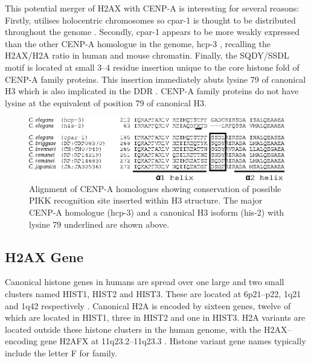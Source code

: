This potential merger of H2AX with \mbox{CENP-A} is interesting for
several reasons: Firstly,  utilises holocentric
chromosomes so \mbox{cpar-1} is thought to be distributed throughout
the genome \citep{MMH+05}. Secondly, \mbox{cpar-1} appears to be more
weakly expressed than the other \mbox{CENP-A} homologue in the
 genome, \mbox{hcp-3} \citep{MMH+05}, recalling
the H2AX/H2A ratio in human and mouse chromatin. Finally, the
SQDY/SSDL motif is located at small 3--4 residue insertion unique to
the core histone fold of \mbox{CENP-A} family proteins.
This insertion immediately abuts lysine 79 of canonical H3 which is
also implicated in the DDR
\@. \mbox{CENP-A} family
proteins do not have lysine at the equivalent of position 79 of
canonical H3.

\begin{figure}
\centering
\includegraphics{h2ax-review/figs/Fig1}
\caption[Alignment of  \mbox{CENP-A} homologues]%
        {Alignment of  \mbox{CENP-A}
          homologues showing conservation of possible PIKK recognition
          site inserted within H3 structure. The major
           \mbox{CENP-A} homologue
          (\mbox{hcp-3}) and a canonical H3 isoform (\mbox{his-2})
          with lysine 79 underlined are shown above.}
\label{fig:h2ax-review:celegans}
\end{figure}

\subsection{H2AX Gene}
Canonical histone genes in humans are spread over one large and two
small clusters named HIST1, HIST2 and HIST3. These are located at
6p21--p22, 1q21 and 1q42 respectively
.
Canonical H2A is encoded by sixteen genes, twelve of which are located
in HIST1, three in HIST2 and one in HIST3. H2A variants are located
outside these histone clusters in the human genome, with the
H2AX--encoding gene H2AFX at 11q23.2--11q23.3 \citep{IZP+94}
.
Histone variant gene names typically include the letter F for family.

